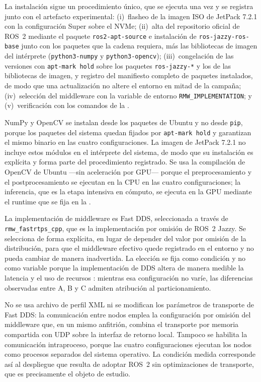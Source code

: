 La instalación sigue un procedimiento único, que se ejecuta una vez y se
registra junto con el artefacto experimental: (i)~flasheo de la imagen ISO de
JetPack 7.2.1 con la configuración Super sobre el NVMe; (ii)~alta del
repositorio oficial de ROS~2 mediante el paquete \texttt{ros2-apt-source} e
instalación de \texttt{ros-jazzy-ros-base} junto con los paquetes que la
cadena requiera, más las bibliotecas de imagen del intérprete
(\texttt{python3-numpy} y \texttt{python3-opencv}); (iii)~congelación de las
versiones con \texttt{apt-mark hold} sobre los paquetes \texttt{ros-jazzy-*}
y los de las bibliotecas de imagen, y registro del manifiesto completo de
paquetes instalados, de modo que una actualización no altere el entorno en
mitad de la campaña; (iv)~selección del middleware con la variable de entorno
\texttt{RMW\_IMPLEMENTATION}; y (v)~verificación con los comandos de la
.

NumPy y OpenCV se instalan desde los paquetes de Ubuntu y no desde
\texttt{pip}, porque los paquetes del sistema quedan fijados por
\texttt{apt-mark hold} y garantizan el mismo binario en las cuatro
configuraciones. La imagen de JetPack 7.2.1 no incluye estos módulos en el
intérprete del sistema, de modo que su instalación es explícita y forma parte
del procedimiento registrado. Se usa la compilación de OpenCV de Ubuntu —sin
aceleración por GPU— porque el preprocesamiento y el postprocesamiento se
ejecutan en la CPU en las cuatro configuraciones; la inferencia, que es la
etapa intensiva en cómputo, se ejecuta en la GPU mediante el runtime que se
fija en la .

La implementación de middleware es Fast DDS, seleccionada a través de
\texttt{rmw\_fastrtps\_cpp}, que es la implementación por omisión de ROS~2
Jazzy. Se selecciona de forma explícita, en lugar de depender del valor por
omisión de la distribución, para que el middleware efectivo quede registrado
en el entorno y no pueda cambiar de manera inadvertida. La elección se fija
como condición y no como variable porque la implementación de DDS altera de
manera medible la latencia y el uso de recursos \cite{maruyama2016,
kronauer2021, zhang2024}: mientras esa configuración no varíe, las diferencias
observadas entre A, B y C admiten atribución al particionamiento.

No se usa archivo de perfil XML ni se modifican los parámetros de transporte
de Fast DDS: la comunicación entre nodos emplea la configuración por omisión
del middleware que, en un mismo anfitrión, combina el transporte por memoria
compartida con UDP sobre la interfaz de retorno local. Tampoco se habilita la
comunicación intraproceso, porque las cuatro configuraciones ejecutan los nodos
como procesos separados del sistema operativo. La condición medida corresponde
así al despliegue que resulta de adoptar ROS~2 sin optimizaciones de
transporte, que es precisamente el objeto de estudio.

